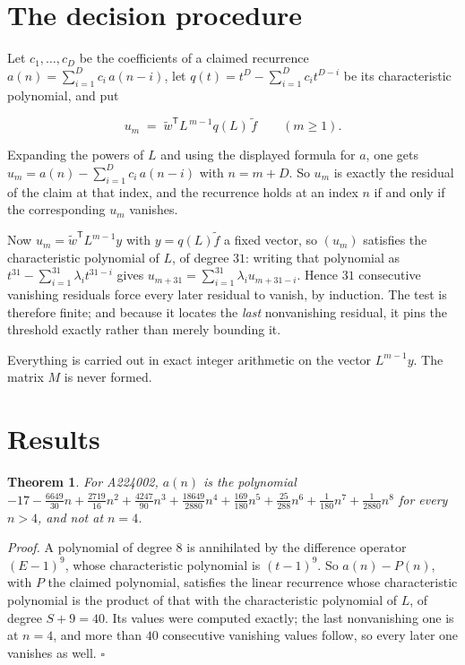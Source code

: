 \documentclass[11pt]{article}
\newtheorem{theorem}{Theorem}
\theoremstyle{definition}
\begin{document}
\section{The decision procedure}

Let $c_1,\dots,c_D$ be the coefficients of a claimed recurrence $a(n) = \sum_{i=1}^{D} c_i\,a(n-i)$, let $q(t) = t^{D} - \sum_{i=1}^{D} c_i t^{D-i}$ be its characteristic polynomial, and put

\[u_m \;=\; \tilde w^{\mathsf T} L^{\,m-1} q(L)\,\tilde f \qquad (m \ge 1).\]

Expanding the powers of $L$ and using the displayed formula for $a$, one gets $u_m = a(n) - \sum_{i=1}^{D} c_i\,a(n-i)$ with $n = m + D$. So $u_m$ is exactly the residual of the claim at that index, and the recurrence holds at an index $n$ if and only if the corresponding $u_m$ vanishes.

Now $u_m = \tilde w^{\mathsf T} L^{m-1} y$ with $y = q(L)\tilde f$ a fixed vector, so $(u_m)$ satisfies the characteristic polynomial of $L$, of degree $31$: writing that polynomial as $t^{31} - \sum_{i=1}^{31} \lambda_i t^{31-i}$ gives $u_{m+31} = \sum_{i=1}^{31} \lambda_i u_{m+31-i}$. Hence $31$ consecutive vanishing residuals force every later residual to vanish, by induction. The test is therefore finite; and because it locates the {\itshape last} nonvanishing residual, it pins the threshold exactly rather than merely bounding it.

Everything is carried out in exact integer arithmetic on the vector $L^{m-1}y$. The matrix $M$ is never formed.

\section{Results}

\begin{theorem} For A224002, $a(n)$ is the polynomial $-17 - \frac{6649}{30}n + \frac{2719}{16}n^{2} + \frac{4247}{90}n^{3} + \frac{18649}{2880}n^{4} + \frac{169}{180}n^{5} + \frac{25}{288}n^{6} + \frac{1}{180}n^{7} + \frac{1}{2880}n^{8}$ for every $n > 4$, and not at $n = 4$.\end{theorem}

{\itshape Proof.} A polynomial of degree $8$ is annihilated by the difference operator $(E-1)^{9}$, whose characteristic polynomial is $(t-1)^{9}$. So $a(n) - P(n)$, with $P$ the claimed polynomial, satisfies the linear recurrence whose characteristic polynomial is the product of that with the characteristic polynomial of $L$, of degree $S + 9 = 40$. Its values were computed exactly; the last nonvanishing one is at $n = 4$, and more than $40$ consecutive vanishing values follow, so every later one vanishes as well. $\square$
\end{document}
